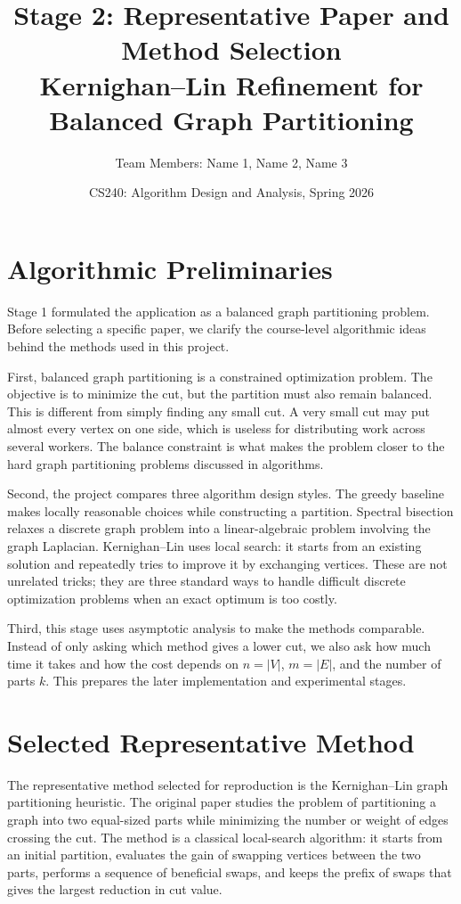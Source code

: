 \documentclass[11pt]{article}
\title{\textbf{Stage 2: Representative Paper and Method Selection}\\
Kernighan--Lin Refinement for Balanced Graph Partitioning}
\author{Team Members: Name 1, Name 2, Name 3}
\date{CS240: Algorithm Design and Analysis, Spring 2026}
\begin{document}
\maketitle

\section{Algorithmic Preliminaries}

Stage 1 formulated the application as a balanced graph partitioning problem.
Before selecting a specific paper, we clarify the course-level algorithmic
ideas behind the methods used in this project.

First, balanced graph partitioning is a constrained optimization problem. The
objective is to minimize the cut, but the partition must also remain balanced.
This is different from simply finding any small cut. A very small cut may put
almost every vertex on one side, which is useless for distributing work across
several workers. The balance constraint is what makes the problem closer to
the hard graph partitioning problems discussed in algorithms.

Second, the project compares three algorithm design styles. The greedy
baseline makes locally reasonable choices while constructing a partition.
Spectral bisection relaxes a discrete graph problem into a linear-algebraic
problem involving the graph Laplacian. Kernighan--Lin uses local search: it
starts from an existing solution and repeatedly tries to improve it by
exchanging vertices. These are not unrelated tricks; they are three standard
ways to handle difficult discrete optimization problems when an exact optimum
is too costly.

Third, this stage uses asymptotic analysis to make the methods comparable.
Instead of only asking which method gives a lower cut, we also ask how much
time it takes and how the cost depends on $n=|V|$, $m=|E|$, and the number of
parts $k$. This prepares the later implementation and experimental stages.

\section{Selected Representative Method}

The representative method selected for reproduction is the Kernighan--Lin graph
partitioning heuristic. The original paper studies the problem of partitioning
a graph into two equal-sized parts while minimizing the number or weight of
edges crossing the cut. The method is a classical local-search algorithm: it
starts from an initial partition, evaluates the gain of swapping vertices
between the two parts, performs a sequence of beneficial swaps, and keeps the
prefix of swaps that gives the largest reduction in cut value.
\end{document}
